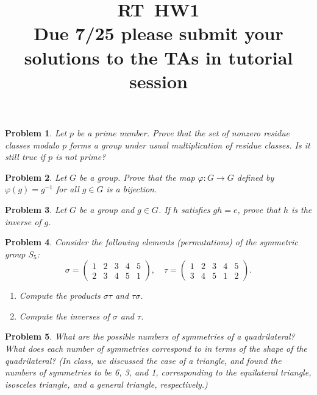 \documentclass{article}
\title{RT\ HW1 \\ Due 7/25 please submit your solutions to the TAs in tutorial session}
\newtheorem{ex}{Problem}
\begin{document}
\maketitle

\begin{ex}
Let $p$ be a prime number. Prove that the set of nonzero residue classes modulo $p$ forms a group under usual multiplication of residue classes. Is it still true if $p$ is not prime?
\end{ex}

\begin{ex}
  Let $G$ be a group. Prove that the map $\varphi: G \to G$ defined by $\varphi(g) = g^{-1}$ for all $g \in G$ is a bijection.
\end{ex}

\begin{ex}
  Let $G$ be a group and $g \in G$. If $h$ satisfies $gh = e$, prove that $h$ is the inverse of $g$. 
\end{ex}

\begin{ex}
Consider the following elements (permutations) of the symmetric group $S_5$:
\[\sigma = \begin{pmatrix}
1 & 2 & 3 & 4 & 5 \\
2 & 3 & 4 & 5 & 1
\end{pmatrix}, \quad \tau = \begin{pmatrix}
1 & 2 & 3 & 4 & 5 \\ 
3 & 4 & 5 & 1 & 2
\end{pmatrix}.\]
\begin{enumerate}
  \item Compute the products $\sigma \tau$ and $\tau \sigma$.
  \item Compute the inverses of $\sigma$ and $\tau$.
\end{enumerate}

\end{ex}

\begin{ex}
What are the possible numbers of symmetries of a quadrilateral? What does each number of symmetries correspond to in terms of the shape of the quadrilateral? (In class, we discussed the case of a triangle, and found the numbers of symmetries to be 6, 3, and 1, corresponding to the equilateral triangle, isosceles triangle, and a general triangle, respectively.)
\end{ex}
\end{document}
